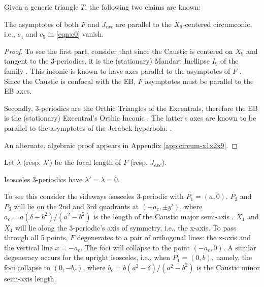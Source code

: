 
Given a generic triangle $T$, the following two claims are known:

\begin{proposition}
The asymptotes of both $F$ and $J_{exc}$ are parallel to the $X_9$-centered circumconic, i.e., $c_4$ and $c_5$ in \eqref{eqn:e0} vanish.
\end{proposition}

\begin{proof}
To see the first part, consider that since the Caustic is centered on $X_9$ and tangent to the 3-periodics, it is the (stationary) Mandart Inellipse $I_9$ of the family \cite{mw}. This inconic is known to have axes parallel to the asymptotes of $F$ \cite{gibert2004-mandart}. Since the Caustic is confocal with the EB, $F$ asymptotes must be parallel to the EB axes.

Secondly, 3-periodics are the Orthic Triangles of the Excentrals, therefore the EB is the (stationary) Excentral's Orthic Inconic \cite{mw}. The latter's axes are known to be parallel to the asymptotes of the Jerabek hyperbola. \cite[Orthic Inconic]{mw}.

An alternate, algebraic proof appears in Appendix \ref{app:circum-x1x2x9}.
\end{proof}

\noindent Let $\lambda$ (resp. $\lambda'$) be the focal length of $F$ (resp. $J_{exc}$).

\begin{remark}
Isosceles 3-periodics have $\lambda'=\lambda=0$.
\end{remark}

To see this consider the sideways isosceles 3-periodic with $P_1=(a,0)$. $P_2$ and $P_3$ will lie on the 2nd and 3rd quadrants at $(-a_c,{\pm}y')$, where $a_c=a(\delta-b^2)/(a^2-b^2)$ is the length of the Caustic major semi-axis \cite{garcia2020-ellipses}. $X_1$ and $X_4$ will lie along the 3-periodic's axis of symmetry, i.e., the x-axis. To pass through all 5 points, $F$ degenerates to a pair of orthogonal lines: the x-axis and the vertical line $x=-a_c$. The foci will collapse to the point $(-a_c,0)$. A similar degeneracy occurs for the upright isosceles, i.e., when $P_1=(0,b)$, namely, the foci collapse to $(0,-b_c)$, where $b_c=b(a^2-\delta)/(a^2-b^2)$ is the Caustic minor semi-axis length.


